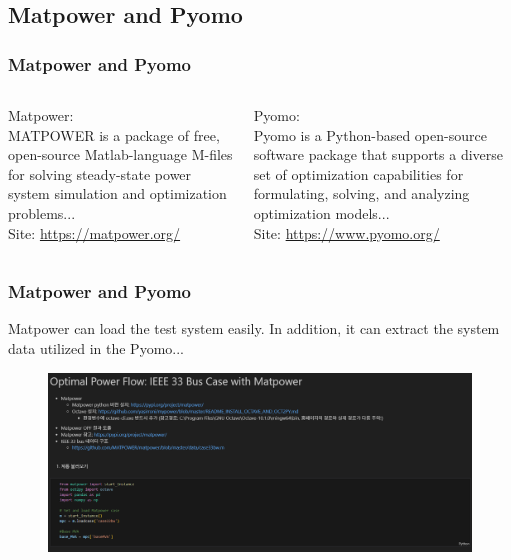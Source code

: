 \documentclass[
	11pt, %
	aspectratio=169, %
]{beamer}
\begin{document}
\subsection{Matpower and Pyomo}
\begin{frame}
	\frametitle{Matpower and Pyomo}

	\begin{columns}
		
		\begin{column}{0.5\textwidth}
			Matpower: \\
			MATPOWER is a package of free, open-source Matlab-language M-files for solving steady-state power system simulation and optimization problems...\parencite{5491276}\\
			Site: \url{https://matpower.org/}
		\end{column}
		
		\begin{column}{0.5\textwidth}
			Pyomo:\\ Pyomo is a Python-based open-source software package that supports a diverse set of optimization capabilities for formulating, solving, and analyzing optimization models...\parencite{bynum2021pyomo}\\
			Site: \url{https://www.pyomo.org/}
		\end{column}



	\end{columns}

	
\end{frame}


\begin{frame}
	\frametitle{Matpower and Pyomo}
	Matpower can load the test system easily. In addition, it can extract the system data utilized in the Pyomo...

	\begin{figure}
		\includegraphics[width=4 in,keepaspectratio]{matpower.png}
	\end{figure}

	
\end{frame}
\end{document}

